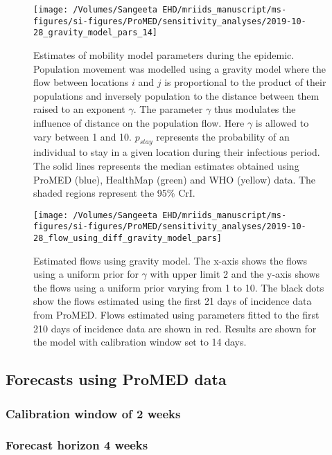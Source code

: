 \documentclass[9pt,twoside,lineno]{pnas-new}
\begin{document}
\begin{figure}
  \centering 
   \texttt{[image: /Volumes/Sangeeta EHD/mriids\_manuscript/ms-figures/si-figures/ProMED/sensitivity\_analyses/2019-10-28\_gravity\_model\_pars\_14]}
  \caption{Estimates of mobility model
  parameters during the epidemic. Population movement was modelled using a
  gravity model where the flow between locations \(i\) and \(j\) is
  proportional to the product of their populations and inversely
  population to the distance between them raised to an exponent \(\gamma\).
  The parameter \(\gamma\) thus modulates the influence of distance on the
  population flow. Here \(\gamma\) is allowed to vary between 1 and 10.
  \(p_{stay}\) represents the probability of an individual to stay in a
  given location during their infectious period. The solid lines
  represents the median estimates obtained using ProMED (blue),
  HealthMap (green) and WHO (yellow) data. The shaded
  regions represent the 95\% CrI.}
\label{fig:parsul10}
\end{figure}\FloatBarrier

\begin{figure}
\centering
   \texttt{[image: /Volumes/Sangeeta
     EHD/mriids\_manuscript/ms-figures/si-figures/ProMED/sensitivity\_analyses/2019-10-28\_flow\_using\_diff\_gravity\_model\_pars]}
\caption{Estimated flows using gravity model. The x-axis shows the flows using a uniform
  prior for $\gamma$ with upper limit 2 and the y-axis shows the flows
  using a uniform prior varying from 1 to 10. The black dots show the
  flows estimated using the first 21 days of incidence data from ProMED. Flows
  estimated using parameters fitted to the first 210 days of incidence
  data are shown in red. Results are shown for the model with
  calibration window set to 14 days.}
\label{fig:flows2}
\end{figure}\FloatBarrier

\subsection{Forecasts using ProMED data}\label{forecasts-using-promed-data-1}
\subsubsection{Calibration window of 2 weeks}\label{sec:pm2-3-2}
\subsubsection{Forecast horizon 4 weeks}\label{forecast-horizon-4-weeks-8}
\end{document}
